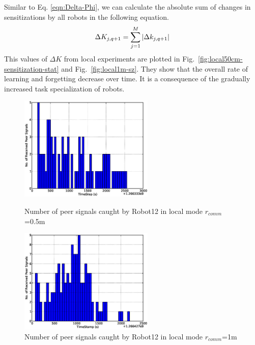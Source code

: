 \documentclass[letterpaper, 10 pt, conference]{ieeeconf}  %
\begin{document}
%
Similar to Eq. \ref{eqn:Delta-Phi}, we can calculate the absolute sum of changes in sensitizations by all robots in the following equation.
% 
\begin{equation}
\small 
\Delta K_{j, q+1} = \sum_{j=1}^{M} \left | \Delta k_{j, q+1} \right |
\label{eqn:Delta-K}
\end{equation}
This values of $\Delta K$ from local experiments are plotted in Fig.~\ref{fig:local50cm-sensitization-stat}  and Fig.~\ref{fig:local1m-sz}. They show that the overall rate of learning and forgetting decrease over time. It is a consequence of the gradually increased task specialization of robots.\\
\begin{figure}
\begin{minipage}[t]{0.5\linewidth}
\centering
\includegraphics[height=5cm, angle=0]{images/local-500cm/Robot12-16feb-1-LocalSignals.eps}
\caption{\small Number of peer signals caught by Robot12 in local mode $r_{comm}$=0.5m}
\label{fig:local50cm-single-robot-signal}%
\end{minipage} 
\begin{minipage}[t]{0.5\linewidth}
\centering
\includegraphics[height=5cm, angle=0]{images/local-1m/Robot12-17feb-3-LocalSignals.eps}
\caption{\small Number of peer signals caught by Robot12 in local mode $r_{comm}$=1m}
\label{fig:local1m-single-robot-signal} %
\end{minipage}
\end{figure}
\end{document}
